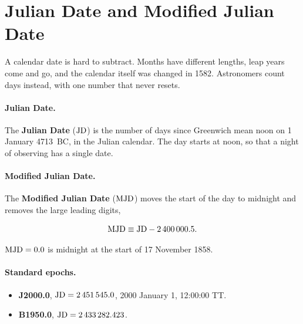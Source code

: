 \section{Julian Date and Modified Julian Date}
\label{ti:sec:jd}

A calendar date is hard to subtract. Months have different lengths, leap years come and go, and the calendar itself was changed in 1582. Astronomers count days instead, with one number that never resets.

\paragraph{Julian Date.} The \textbf{Julian Date} ($\mathrm{JD}$) is the number of days since Greenwich mean noon on 1 January 4713~BC, in the Julian calendar. The day starts at noon, so that a night of observing has a single date.

\paragraph{Modified Julian Date.} The \textbf{Modified Julian Date} ($\mathrm{MJD}$) moves the start of the day to midnight and removes the large leading digits,
\begin{keyresult}
	\begin{equation}
		\mathrm{MJD} \equiv \mathrm{JD} - 2\,400\,000.5.
		\label{eq:mjd_def}
	\end{equation}
\end{keyresult}
$\mathrm{MJD} = 0.0$ is midnight at the start of 17 November 1858.

\paragraph{Standard epochs.}
\begin{itemize}
	\item \textbf{J2000.0}, $\mathrm{JD} = 2\,451\,545.0$, 2000 January 1, 12:00:00 TT.
	\item \textbf{B1950.0}, $\mathrm{JD} = 2\,433\,282.423$.
\end{itemize}

